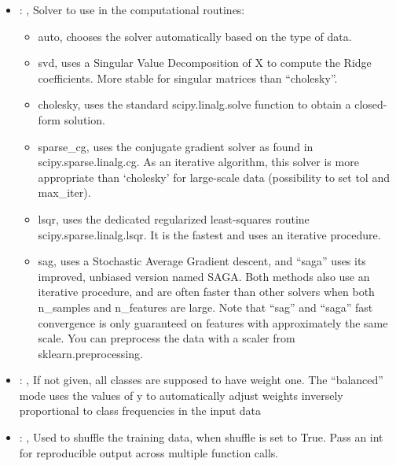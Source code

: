 \begin{itemize}
    \item {}: , 
      Solver to use in the computational routines:
      \begin{itemize}                                                    \item auto, chooses the
      solver automatically based on the type of data.
      \item svd, uses a Singular Value Decomposition of X to compute the Ridge coefficients. More
      stable for singular                                                                matrices
      than ``cholesky''.                                                    \item cholesky, uses the
      standard scipy.linalg.solve function to obtain a closed-form solution.
      \item sparse\_cg, uses the conjugate gradient solver as found in scipy.sparse.linalg.cg. As an
      iterative algorithm,                                                               this solver
      is more appropriate than ‘cholesky’ for large-scale data (possibility to set tol and
      max\_iter).                                                    \item lsqr, uses the dedicated
      regularized least-squares routine scipy.sparse.linalg.lsqr. It is the fastest and uses
      an iterative procedure.                                                    \item sag, uses a
      Stochastic Average Gradient descent, and ``saga'' uses its improved, unbiased version named
      SAGA.                                                               Both methods also use an
      iterative procedure, and are often faster than other solvers when both
      n\_samples and n\_features are large. Note that ``sag'' and ``saga'' fast convergence is only
      guaranteed on                                                               features with
      approximately the same scale. You can preprocess the data with a scaler from
      sklearn.preprocessing.                                                  \end{itemize}

    \item {}: \xmlDesc{[balanced]}, 
      If not given, all classes are supposed to have weight one.
      The “balanced” mode uses the values of y to automatically adjust weights
      inversely proportional to class frequencies in the input data

    \item {}: , 
      Used to shuffle the training data, when shuffle is set to
      True. Pass an int for reproducible output across multiple function calls.
  \end{itemize}


